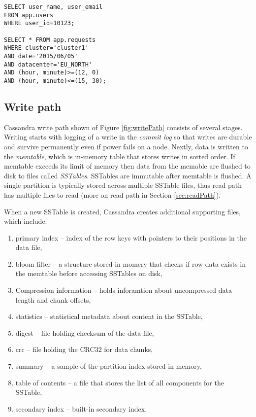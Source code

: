 \begin{lstlisting}[style=outcode,label={lst:cqlSelect},caption={Examples of CQL select statements}]
SELECT user_name, user_email 
FROM app.users 
WHERE user_id=10123;
    
SELECT * FROM app.requests
WHERE cluster='cluster1'
AND date='2015/06/05'
AND datacenter='EU_NORTH'
AND (hour, minute)>=(12, 0) 
AND (hour, minute)<=(15, 30);
\end{lstlisting}


\subsection{Write path}
Cassandra write path \cite{CassandraWritePath} shown of Figure \ref{fig:writePath} consists of several stages. Writing starts with logging of a write in the \emph{commit log} so that writes are durable and survive permanently even if power fails on a node. 
Nextly, data is written to the \emph{memtable}, which is in-memory table that stores writes in sorted order.
If memtable exceeds its limit of memory then data from the memable are flushed to disk to files called \emph{SSTables}. SSTables are immutable after memtable is flushed. A single partition is typically stored across multiple SSTable files, thus read path has multiple files to read (more on read path in Section \ref{sec:readPath}).

When a new SSTable is created, Cassandra creates additional supporting files, which include: \begin{enumerate}
\item primary index -- index of the row keys with pointers to their positions in the data file,
\item bloom filter -- a structure stored in momery that checks if row data exists in the memtable before accessing SSTables on disk,
\item Compression information -- holds inforamtion about uncompressed data length and chunk offsets,
\item statistics -- statistical metadata about content in the SSTable,
\item digest -- file holding checksum of the data file,
\item crc -- file holding the CRC32 for data chunks,
\item summary -- a sample of the partition index stored in memory,
\item table of contents -- a file that stores the list of all components for the SSTable,
\item secondary index -- built-in secondary index.
\end{enumerate}

